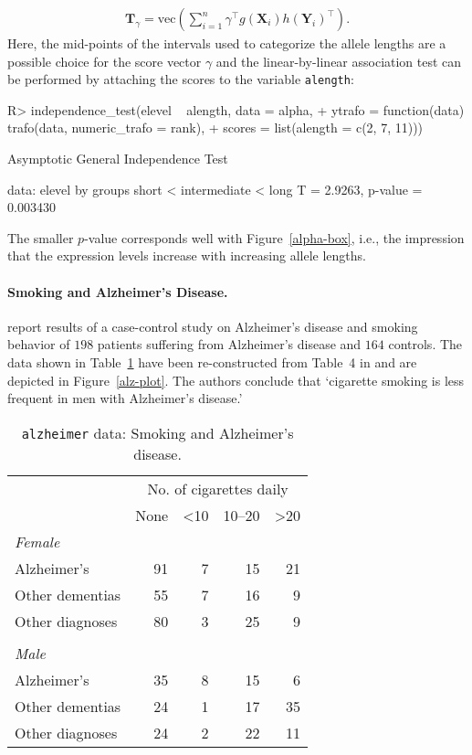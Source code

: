 \documentclass{article}
\newcommand{\Robject}[1]{\texttt{#1}}
\newcommand{\X}{\mathbf{X}}
\newcommand{\Y}{\mathbf{Y}}
\newcommand{\T}{\mathbf{T}}
\renewcommand{\vec}{\text{vec}}
\newenvironment{Schunk}{}{}
\begin{document}
\begin{eqnarray*}
\T_\gamma = \vec \left( \sum_{i=1}^n \gamma^\top g(\X_i)
            h(\Y_i)^\top \right).
\end{eqnarray*}
Here, the mid-points of the intervals used to categorize the allele lengths
are a possible choice for the score vector $\gamma$ and the linear-by-linear
association test can be performed by attaching the scores to the variable
\Robject{alength}:
\begin{Schunk}
\begin{Sinput}
R> independence_test(elevel ~ alength, data = alpha, 
+     ytrafo = function(data) trafo(data, numeric_trafo = rank), 
+     scores = list(alength = c(2, 7, 11)))
\end{Sinput}
\begin{Soutput}
	Asymptotic General Independence Test

data:  elevel by groups short < intermediate < long 
T = 2.9263, p-value = 0.003430
\end{Soutput}
\end{Schunk}
The smaller $p$-value corresponds well with Figure~\ref{alpha-box}, i.e., 
the impression that the expression levels increase with increasing 
allele lengths. 

\paragraph{Smoking and Alzheimer's Disease.}


\cite{SalibHillier1997} report results of a case-control study on
Alzheimer's disease and smoking behavior of 
$198$
patients suffering from Alzheimer's disease and 
$164$
controls. The data shown in Table~\ref{alzheimertab} have been 
re-constructed from Table~4 in \cite{SalibHillier1997} and are depicted in
Figure~\ref{alz-plot}. 
The authors conclude that `cigarette smoking is less frequent in 
men with Alzheimer's disease.' 

\begin{table}[h]
\begin{center}
\caption{\Robject{alzheimer} data: Smoking and Alzheimer's disease. \label{alzheimertab}}
\begin{tabular}{lrrrr} \hline \hline
 & \multicolumn{4}{c}{No. of cigarettes daily} \\
 & None & <10 & 10--20 & >20 \\ \hline
\textit{Female} & & & & \\
Alzheimer's  &  91 & 7 & 15 & 21 \\ 
Other dementias  &  55 & 7 & 16 & 9 \\ 
Other diagnoses  &  80 & 3 & 25 & 9 \\ 
& & & & \\
\textit{Male} & & & & \\
Alzheimer's  &  35 & 8 & 15 & 6 \\ 
Other dementias  &  24 & 1 & 17 & 35 \\ 
Other diagnoses  &  24 & 2 & 22 & 11 \\ \hline
\end{tabular}
\end{center}
\end{table}
\end{document}
